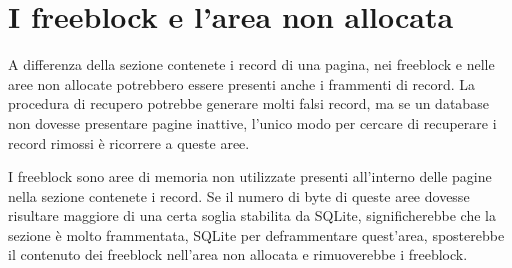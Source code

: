 \section{I freeblock e l'area non allocata}

A differenza della sezione contenete i record di una pagina, nei freeblock e nelle aree non allocate potrebbero essere presenti anche i frammenti di record. La procedura di recupero potrebbe generare molti falsi record, ma se un database non dovesse presentare pagine inattive, l'unico modo per cercare di recuperare i record rimossi è ricorrere a queste aree.

\medskip

I freeblock sono aree di memoria non utilizzate presenti all'interno delle pagine nella sezione contenete i record. Se il numero di byte di queste aree dovesse risultare maggiore di una certa soglia stabilita da SQLite, significherebbe che la sezione è molto frammentata, SQLite per deframmentare quest'area, sposterebbe il contenuto dei freeblock nell'area non allocata e rimuoverebbe i freeblock.


